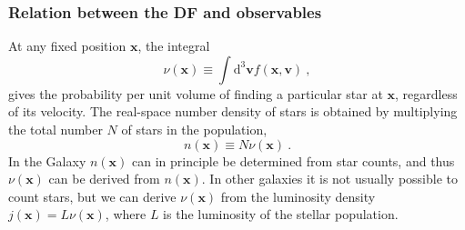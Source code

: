 \documentclass[12pt,a4paper]{article}
\renewcommand{\vec}[1]{\boldsymbol{#1}}
\newcommand{\dif}{\mathrm{d}}
\begin{document}
\subsubsection{Relation between the DF and observables}
At any fixed position $\vec{x}$, the integral
\begin{equation}
\nu(\vec{x}) \equiv \int \dif^3 \vec{v} f(\vec{x}, \vec{v}) ~,
\end{equation}
gives the probability per unit volume of finding a particular star at $\vec{x}$, regardless of its velocity. The real-space number density of stars is obtained by multiplying the total number $N$ of stars in the population,
\begin{equation}
n(\vec{x}) \equiv N\nu(\vec{x}) ~.
\end{equation}
In the Galaxy $n(\vec{x})$ can in principle be determined from star counts, and thus $\nu(\vec{x})$ can be derived from $n(\vec{x})$. In other galaxies it is not usually possible to count stars, but we can derive $\nu(\vec{x})$ from the luminosity density $j(\vec{x}) = L\nu(\vec{x})$, where $L$ is the luminosity of the stellar population.
\end{document}
